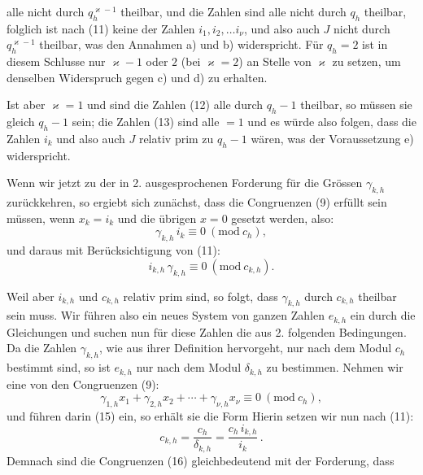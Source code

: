 alle nicht durch $q_h^{\varkappa-1}$ theilbar, und die Zahlen
sind alle nicht durch $q_h$ theilbar, folglich ist nach (11) keine der
Zahlen $i_1, i_2, \dots i_\nu$, und also auch $J$ nicht durch $q_h^{\varkappa-1}$ theilbar,
was den Annahmen a) und b) widerspricht. Für $q_h = 2$ ist in
diesem Schlusse nur $\varkappa - 1$ oder $2$ (bei $\varkappa = 2$) an Stelle von $\varkappa$
zu setzen, um denselben Widerspruch gegen c) und d) zu erhalten.

    Ist aber $\varkappa = 1$ und sind die Zahlen (12) alle durch $q_h - 1$
theilbar, so müssen sie gleich $q_h - 1$ sein; die Zahlen (13) sind
alle $= 1$ und es würde also folgen, dass die Zahlen $i_k$ und
also auch $J$ relativ prim zu $q_h - 1$ wären, was der Voraussetzung e) widerspricht.

    Wenn wir jetzt zu der in 2. ausgesprochenen Forderung für
die Grössen $\gamma_{k,h}$ zurückkehren, so ergiebt sich zunächst, dass
die Congruenzen (9) erfüllt sein müssen, wenn $x_k = i_k$ und die
übrigen $x = 0$ gesetzt werden, also:
\[
\gamma_{k,h}\, i_k \equiv 0\ (\mathrm{mod}\ c_h),
\]
und daraus mit Berücksichtigung von (11):
\[
i_{k,h}\, \gamma_{k,h} \equiv 0\ (\mathrm{mod}\ c_{k,h}).
\]

    Weil aber $i_{k,h}$ und $c_{k,h}$ relativ prim sind, so folgt, dass $\gamma_{k,h}$
durch $c_{k,h}$ theilbar sein muss. Wir führen also ein neues System
von ganzen Zahlen $e_{k,h}$ ein durch die Gleichungen
und suchen nun für diese Zahlen die aus 2. folgenden Bedingungen. Da die Zahlen $\gamma_{k,h}$, wie aus ihrer Definition hervorgeht, nur nach dem Modul $c_h$ bestimmt sind, so ist $e_{k,h}$ nur nach
dem Modul $\delta_{k,h}$ zu bestimmen. Nehmen wir eine von den Congruenzen (9):
\[
\gamma_{1,h}x_1 + \gamma_{2,h}x_2 + \cdots + \gamma_{\nu,h}x_\nu \equiv 0\ (\mathrm{mod}\ c_h),
\]
und führen darin (15) ein, so erhält sie die Form
Hierin setzen wir nun nach (11):
\[
c_{k,h} = \frac{c_h}{\delta_{k,h}} = \frac{c_h\, i_{k,h}}{i_k}\,.
\]
Demnach sind die Congruenzen (16) gleichbedeutend mit
der Forderung, dass
